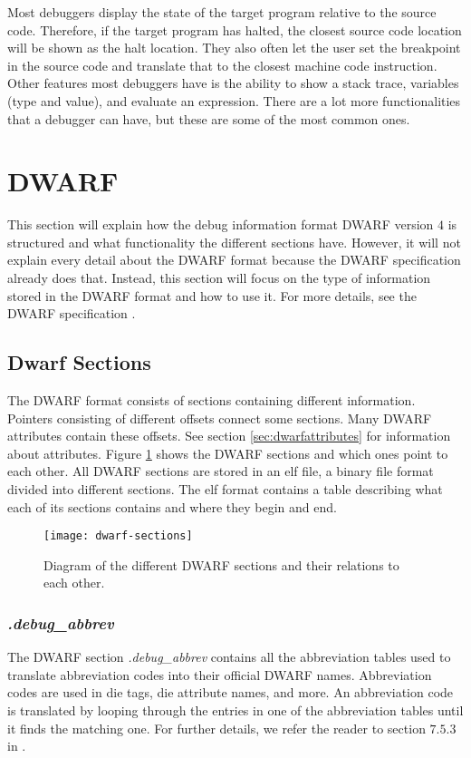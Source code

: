 Most debuggers display the state of the target program relative to the source code.
Therefore, if the target program has halted, the closest source code location will be shown as the halt location.
They also often let the user set the breakpoint in the source code and translate that to the closest machine code instruction.
Other features most debuggers have is the ability to show a stack trace, variables (type and value), and evaluate an expression.
There are a lot more functionalities that a debugger can have, but these are some of the most common ones.


\section{DWARF}
\label{sec:dwarf}
This section will explain how the debug information format \acrfull{DWARF} version $4$ is structured and what functionality the different sections have.
However, it will not explain every detail about the \gls{DWARF} format because the \gls{DWARF} specification already does that.
Instead, this section will focus on the type of information stored in the \gls{DWARF} format and how to use it.
For more details, see the \gls{DWARF} specification \cite{dwarf}.


\subsection{Dwarf Sections}
The \gls{DWARF} format consists of sections containing different information.
Pointers consisting of different offsets connect some sections.
Many \gls{DWARF} attributes contain these offsets. See section \ref{sec:dwarfattributes} for information about attributes.
Figure \ref{fig:dwarfsections} shows the \gls{DWARF} sections and which ones point to each other.
All \gls{DWARF} sections are stored in an \gls{elf} file, a binary file format divided into different sections.
The \gls{elf} format contains a table describing what each of its sections contains and where they begin and end.


\begin{figure}[h]
	\centering
	\texttt{[image: dwarf-sections]}
	\caption{Diagram of the different \gls{DWARF} sections and their relations to each other.}
	\label{fig:dwarfsections}
\end{figure}


\subsubsection{\emph{.debug\_abbrev}}
The \gls{DWARF} section \emph{.debug\_abbrev} contains all the abbreviation tables used to translate abbreviation codes into their official \gls{DWARF} names.
Abbreviation codes are used in \acrfull{die} tags, \gls{die} attribute names, and more.
An abbreviation code is translated by looping through the entries in one of the abbreviation tables until it finds the matching one.
For further details, we refer the reader to section $7.5.3$ in \cite{dwarf}.


